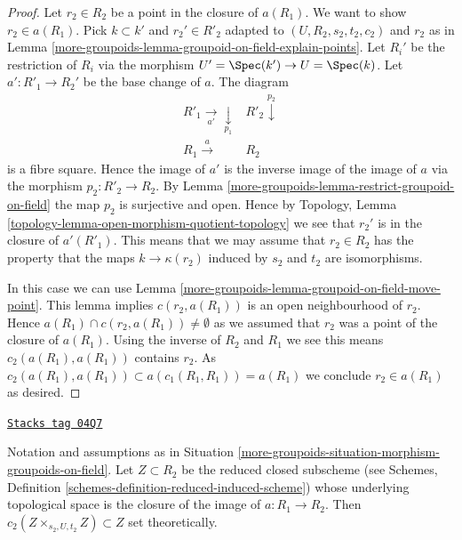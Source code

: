 \begin{proof}
Let $r_2 \in R_2$ be a point in the closure of $a(R_1)$.
We want to show $r_2 \in a(R_1)$. Pick $k \subset k'$ and
$r_2' \in R'_2$ adapted to $(U, R_2, s_2, t_2, c_2)$ and $r_2$ as in
Lemma \ref{more-groupoids-lemma-groupoid-on-field-explain-points}.
Let $R_i'$ be the restriction of $R_i$ via the morphism
$U' = \Spec(k') \to U = \Spec(k)$.
Let $a' : R'_1 \to R_2'$ be the base change of $a$. The diagram
$$
\begin{array}{cc}R'_1 \underset{a'}{\longrightarrow}\underset{p_1}{\downarrow} & R'_2 \overset{p_2}{\downarrow} \\ R_1 \overset{a}{\longrightarrow} & R_2\end{array}
$$
is a fibre square. Hence the image of $a'$ is the inverse image of
the image of $a$ via the morphism $p_2 : R'_2 \to R_2$. By
Lemma \ref{more-groupoids-lemma-restrict-groupoid-on-field}
the map $p_2$ is surjective and open. Hence by
Topology, Lemma \ref{topology-lemma-open-morphism-quotient-topology}
we see that $r_2'$ is in the closure of $a'(R'_1)$.
This means that we may assume that $r_2 \in R_2$ has
the property that the maps $k \to \kappa(r_2)$ induced
by $s_2$ and $t_2$ are isomorphisms.

\medskip\noindent
In this case we can use
Lemma \ref{more-groupoids-lemma-groupoid-on-field-move-point}.
This lemma implies $c(r_2, a(R_1))$ is an open neighbourhood of $r_2$.
Hence $a(R_1) \cap c(r_2, a(R_1)) \not = \emptyset$ as we assumed
that $r_2$ was a point of the closure of $a(R_1)$.
Using the inverse of $R_2$ and $R_1$ we see this means
$c_2(a(R_1), a(R_1))$ contains $r_2$.
As $c_2(a(R_1), a(R_1)) \subset a(c_1(R_1, R_1)) = a(R_1)$
we conclude $r_2 \in a(R_1)$ as desired.
\end{proof}

\begin{lemma}
\label{more-groupoids-lemma-map-groupoids-on-field-image}
\href{https://stacks.math.columbia.edu/tag/04Q7}{\texttt{Stacks tag 04Q7}}

Notation and assumptions as in
Situation \ref{more-groupoids-situation-morphism-groupoids-on-field}.
Let $Z \subset R_2$ be the reduced closed subscheme (see
Schemes, Definition \ref{schemes-definition-reduced-induced-scheme})
whose underlying topological space is the closure of the image of
$a : R_1 \to R_2$. Then
$c_2(Z \times_{s_2, U, t_2} Z) \subset Z$
set theoretically.
\end{lemma}

